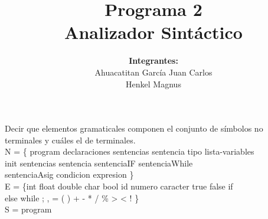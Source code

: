 \documentclass[a4paper,10pt]{article}
\title{Programa 2\\
	   Analizador Sintáctico}
\author{\textbf{Integrantes:}\\
		Ahuacatitan García Juan Carlos \\
		Henkel Magnus}
\begin{document}
\maketitle


\section{}
Decir que elementos gramaticales componen el conjunto de símbolos no  terminales
y cuáles el de terminales.\\

\noindent
N = \{ program declaraciones sentencias sentencia tipo lista-variables\\
\-\hspace{1cm}init sentencias sentencia sentenciaIF sentenciaWhile\\
\-\hspace{1cm}sentenciaAsig condicion expresion \}\\

\noindent
E = \{int float double char bool id numero caracter true false if\\
\-\hspace{1cm}else while ; , = ( ) { } + - * / \% > < ! \}\\

\noindent
S = program
\end{document}
